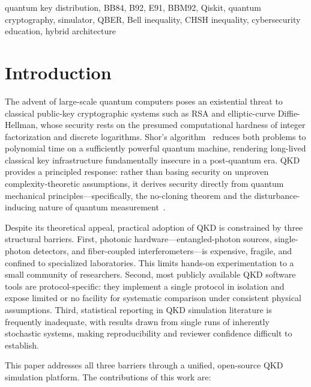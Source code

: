 \documentclass[journal]{IEEEtran}
\begin{document}
\begin{IEEEkeywords}
quantum key distribution, BB84, B92, E91, BBM92, Qiskit, quantum
cryptography, simulator, QBER, Bell inequality, CHSH inequality,
cybersecurity education, hybrid architecture
\end{IEEEkeywords}

\section{Introduction}
\label{sec:intro}

The advent of large-scale quantum computers poses an existential threat
to classical public-key cryptographic systems such as RSA and
elliptic-curve Diffie-Hellman, whose security rests on the presumed
computational hardness of integer factorization and discrete logarithms.
Shor's algorithm~\cite{shor1994} reduces both problems to polynomial
time on a sufficiently powerful quantum machine, rendering long-lived
classical key infrastructure fundamentally insecure in a post-quantum
era. QKD provides a principled response: rather than basing security on
unproven complexity-theoretic assumptions, it derives security directly
from quantum mechanical principles—specifically, the
no-cloning theorem and the disturbance-inducing nature of quantum
measurement~\cite{lo2014}.

Despite its theoretical appeal, practical adoption of QKD is constrained
by three structural barriers. First, photonic hardware—entangled-photon
sources, single-photon detectors, and fiber-coupled interferometers—is
expensive, fragile, and confined to specialized laboratories. This limits
hands-on experimentation to a small community of researchers.
Second, most publicly available QKD software tools are
protocol-specific: they implement a single protocol in isolation and
expose limited or no facility for systematic comparison under consistent
physical assumptions. Third, statistical reporting in QKD simulation
literature is frequently inadequate, with results drawn from single
runs of inherently stochastic systems, making reproducibility and
reviewer confidence difficult to establish.

This paper addresses all three barriers through a unified, open-source
QKD simulation platform. The contributions of this work are:
\end{document}

